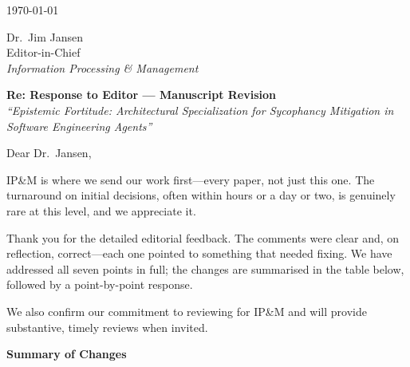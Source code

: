 \documentclass[12pt,a4paper]{article}
\begin{document}

\begin{flushright}
  \today
\end{flushright}

\vspace{0.5cm}

\noindent Dr.\ Jim Jansen \\
Editor-in-Chief \\
\textit{Information Processing \& Management}

\vspace{1cm}

\noindent \textbf{Re: Response to Editor --- Manuscript Revision} \\
\textit{``Epistemic Fortitude: Architectural Specialization for Sycophancy Mitigation in Software Engineering Agents''}

\vspace{1cm}


Dear Dr.\ Jansen,

IP\&M is where we send our work first---every paper, not just this one. The turnaround on initial decisions, often within hours or a day or two, is genuinely rare at this level, and we appreciate it.

Thank you for the detailed editorial feedback. The comments were clear and, on reflection, correct---each one pointed to something that needed fixing. We have addressed all seven points in full; the changes are summarised in the table below, followed by a point-by-point response.

We also confirm our commitment to reviewing for IP\&M and will provide substantive, timely reviews when invited.

\vspace{0.5cm}

\pagebreak
\noindent \textbf{Summary of Changes}

\vspace{0.3cm}
\end{document}
